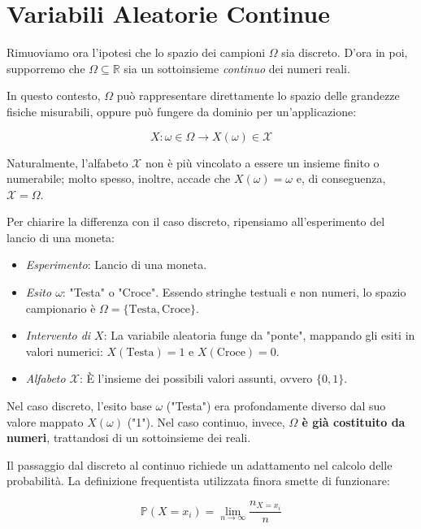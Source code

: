 \section{Variabili Aleatorie Continue}

Rimuoviamo ora l'ipotesi che lo spazio dei campioni $\Omega$ sia discreto. D'ora in poi, supporremo che $\Omega \subseteq \mathbb{R}$ sia un sottoinsieme \textit{continuo} dei numeri reali.

In questo contesto, $\Omega$ può rappresentare direttamente lo spazio delle grandezze fisiche misurabili, oppure può fungere da dominio per un'applicazione:

\begin{equation}
X : \omega \in \Omega \longrightarrow X(\omega) \in \mathcal{X}
\end{equation}

Naturalmente, l'alfabeto $\mathcal{X}$ non è più vincolato a essere un insieme finito o numerabile; molto spesso, inoltre, accade che $X(\omega) = \omega$ e, di conseguenza, $\mathcal{X} = \Omega$.

Per chiarire la differenza con il caso discreto, ripensiamo all'esperimento del lancio di una moneta:
\begin{itemize}
    \item \textit{Esperimento}: Lancio di una moneta.
    \item \textit{Esito $\omega$}: "Testa" o "Croce". Essendo stringhe testuali e non numeri, lo spazio campionario è $\Omega = \{\text{Testa}, \text{Croce}\}$.
    \item \textit{Intervento di $X$}: La variabile aleatoria funge da "ponte", mappando gli esiti in valori numerici: $X(\text{Testa}) = 1$ e $X(\text{Croce}) = 0$.
    \item \textit{Alfabeto $\mathcal{X}$}: È l'insieme dei possibili valori assunti, ovvero $\{0,1\}$.
\end{itemize}

Nel caso discreto, l'esito base $\omega$ ("Testa") era profondamente diverso dal suo valore mappato $X(\omega)$ ("1"). Nel caso continuo, invece, \textbf{$\Omega$ è già costituito da numeri}, trattandosi di un sottoinsieme dei reali.

Il passaggio dal discreto al continuo richiede un adattamento nel calcolo delle probabilità. La definizione frequentista utilizzata finora smette di funzionare:

\begin{equation}
\mathbb{P}(X = x_i) = \lim_{n \to \infty} \frac{n_{X=x_i}}{n}
\end{equation}

